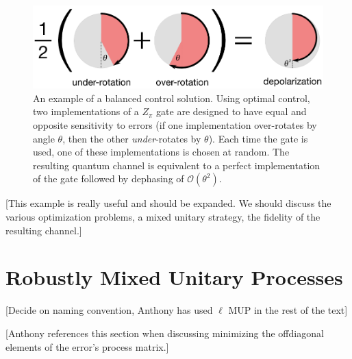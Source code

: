 \documentclass[aps,nofootinbib,pra,notitlepage,twocolumn]{revtex4-1}
\newcommand{\order}[1]{\mathcal{O}\left( #1 \right)}
\newcommand{\note}[1]{{\color{red}[#1]}}
\begin{document}
\begin{figure}
  \centering
  \includegraphics[width=\columnwidth]{simple_example.pdf}
  \caption{An example of a balanced control solution. Using optimal control, two implementations of a $Z_\pi$ gate are designed to have equal and opposite sensitivity to errors (if one implementation over-rotates by angle $\theta$, then the other \emph{under}-rotates by $\theta$). Each time the gate is used, one of these implementations is chosen at random. The resulting quantum channel is equivalent to a perfect implementation of the gate followed by dephasing of $\order{\theta^2}$.}
  \label{fig:simple_example}
\end{figure}

\note{This example is really useful and should be expanded. We should discuss the various optimization problems, a mixed unitary strategy, the fidelity of the resulting channel.}



\section{Robustly Mixed Unitary Processes}
\label{sec:robustly_mixed}
\note{Decide on naming convention, Anthony has used $\ell$ MUP in the rest of the text} 

\note{Anthony references this section when discussing minimizing the offdiagonal elements of the error's process matrix.}
\end{document}
